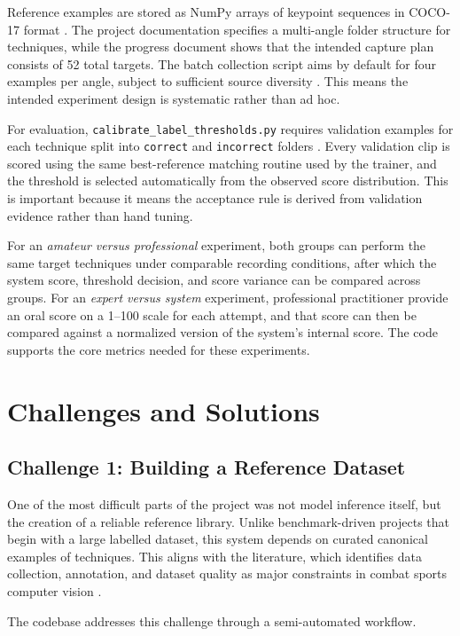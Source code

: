 \documentclass[12pt]{article}
\begin{document}
Reference examples are stored as NumPy arrays of keypoint sequences in COCO-17 format \cite{projectActionRecognition}. The project documentation specifies a multi-angle folder structure for techniques, while the progress document shows that the intended capture plan consists of 52 total targets. The batch collection script aims by default for four examples per angle, subject to sufficient source diversity \cite{projectRunBatch}. This means the intended experiment design is systematic rather than ad hoc.

For evaluation, \texttt{calibrate\_label\_thresholds.py} requires validation examples for each technique split into \texttt{correct} and \texttt{incorrect} folders \cite{projectCalibrate}. Every validation clip is scored using the same best-reference matching routine used by the trainer, and the threshold is selected automatically from the observed score distribution. This is important because it means the acceptance rule is derived from validation evidence rather than hand tuning.

For an \textit{amateur versus professional} experiment, both groups can perform the same target techniques under comparable recording conditions, after which the system score, threshold decision, and score variance can be compared across groups. For an \textit{expert versus system} experiment, professional practitioner provide an oral score on a 1--100 scale for each attempt, and that score can then be compared against a normalized version of the system's internal score. The code supports the core metrics needed for these experiments.

\section{Challenges and Solutions}
\subsection{Challenge 1: Building a Reference Dataset}
One of the most difficult parts of the project was not model inference itself, but the creation of a reliable reference library. Unlike benchmark-driven projects that begin with a large labelled dataset, this system depends on curated canonical examples of techniques. This aligns with the literature, which identifies data collection, annotation, and dataset quality as major constraints in combat sports computer vision \cite{quinn2024automation,quinn2025yolo}.

The codebase addresses this challenge through a semi-automated workflow. 
\end{document}
